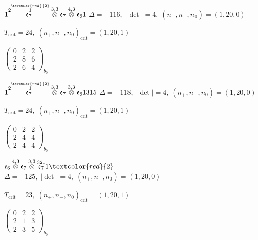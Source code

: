 \documentclass[10pt]{article}
\begin{document}
\smallskip

$1\overset{2\overset{\textcolor{red}{2}}{1}}{\mathfrak{e}_7}\overset{3,3}{\otimes}\mathfrak{e}_7\overset{4,3}{\otimes}\mathfrak{e}_61$ \quad $\Delta=-116,\; |\det|=4,\; (n_+,n_-,n_0)=(1,20,0)$

\hspace{1em}$T_{\text{crit}}=24,\; (n_+,n_-,n_0)_{\text{crit}}=(1,20,1)$

\hspace{2em}$\left(\begin{smallmatrix}0 & 2 & 2 \\ 2 & 8 & 6 \\ 2 & 6 & 4\end{smallmatrix}\right)_{\!b_0}$

\smallskip

$1\overset{2\overset{\textcolor{red}{2}}{1}}{\mathfrak{e}_7}\overset{3,3}{\otimes}\mathfrak{e}_7\overset{3,3}{\otimes}\mathfrak{e}_61315$ \quad $\Delta=-118,\; |\det|=4,\; (n_+,n_-,n_0)=(1,20,0)$

\hspace{1em}$T_{\text{crit}}=24,\; (n_+,n_-,n_0)_{\text{crit}}=(1,20,1)$

\hspace{2em}$\left(\begin{smallmatrix}0 & 2 & 2 \\ 2 & 4 & 4 \\ 2 & 4 & 4\end{smallmatrix}\right)_{\!b_0}$

\smallskip

$\mathfrak{e}_6\overset{4,3}{\otimes}\mathfrak{e}_7\overset{3,3}{\otimes}\overset{321}{\mathfrak{e}_7}1\textcolor{red}{2}$ \quad $\Delta=-125,\; |\det|=4,\; (n_+,n_-,n_0)=(1,20,0)$

\hspace{1em}$T_{\text{crit}}=23,\; (n_+,n_-,n_0)_{\text{crit}}=(1,20,1)$

\hspace{2em}$\left(\begin{smallmatrix}0 & 2 & 2 \\ 2 & 1 & 3 \\ 2 & 3 & 5\end{smallmatrix}\right)_{\!b_0}$
\end{document}
